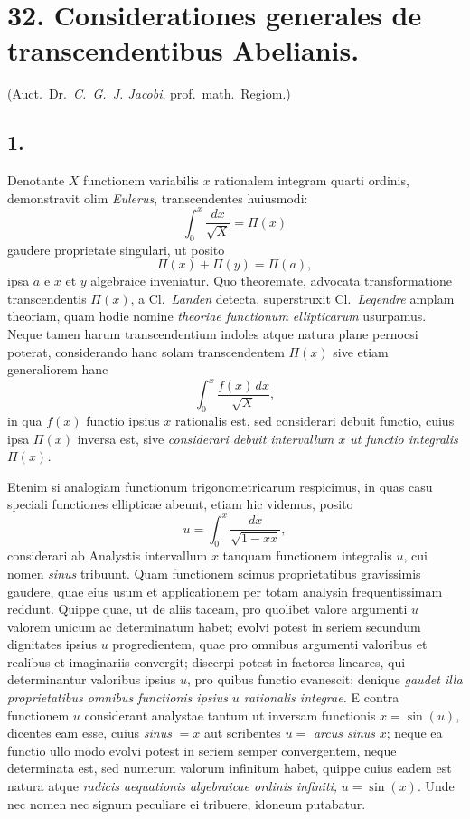 \documentclass{article}
\begin{document}
\section*{32. Considerationes generales de transcendentibus Abelianis.}

(Auct.\ Dr.\ \emph{C.~G.~J. Jacobi}, prof.\ math.\ Regiom.)

\subsection*{1.}

Denotante $X$ functionem variabilis $x$ rationalem integram quarti ordinis, demonstravit olim \emph{Eulerus}, transcendentes huiusmodi:
\[ \int_0^{x} \frac{dx}{\sqrt{X}} = \Pi(x) \]
gaudere proprietate singulari, ut posito
\[ \Pi(x) + \Pi(y) = \Pi(a), \]
ipsa $a$ e $x$ et $y$ algebraice inveniatur. Quo theoremate, advocata transformatione transcendentis $\Pi(x)$, a Cl.\ \emph{Landen} detecta, superstruxit Cl.\ \emph{Legendre} amplam theoriam, quam hodie nomine \emph{theoriae functionum ellipticarum} usurpamus. Neque tamen harum transcendentium indoles atque natura plane pernocsi poterat, considerando hanc solam transcendentem $\Pi(x)$ sive etiam generaliorem hanc
\[ \int_0^{x} \frac{f(x)\,dx}{\sqrt{X}}, \]
in qua $f(x)$ functio ipsius $x$ rationalis est, sed considerari debuit functio, cuius ipsa $\Pi(x)$ inversa est, sive \emph{considerari debuit intervallum $x$ ut functio integralis $\Pi(x)$.}

Etenim si analogiam functionum trigonometricarum respicimus, in quas casu speciali functiones ellipticae abeunt, etiam hic videmus, posito
\[ u = \int_0^{x} \frac{dx}{\sqrt{1-xx}}, \]
considerari ab Analystis intervallum $x$ tanquam functionem integralis $u$, cui nomen \emph{sinus} tribuunt. Quam functionem scimus proprietatibus gravissimis gaudere, quae eius usum et applicationem per totam analysin frequentissimam reddunt. Quippe quae, ut de aliis taceam, pro quolibet valore argumenti $u$ valorem unicum ac determinatum habet; evolvi potest in seriem secundum dignitates ipsius $u$ progredientem, quae pro omnibus argumenti valoribus et realibus et imaginariis convergit; discerpi potest in factores lineares, qui determinantur valoribus ipsius $u$, pro quibus functio evanescit; denique \emph{gaudet illa proprietatibus omnibus functionis ipsius}
\emph{$u$ rationalis integrae.} E contra functionem $u$ considerant analystae tantum ut inversam functionis $x = \sin(u)$, dicentes eam esse, cuius \emph{sinus} $= x$ aut scribentes $u = $ \emph{arcus sinus} $x$; neque ea functio ullo modo evolvi potest in seriem semper convergentem, neque determinata est, sed numerum valorum infinitum habet, quippe cuius eadem est natura atque \emph{radicis aequationis algebraicae ordinis infiniti,} $u = \sin(x)$. Unde nec nomen nec signum peculiare ei tribuere, idoneum putabatur.
\end{document}
